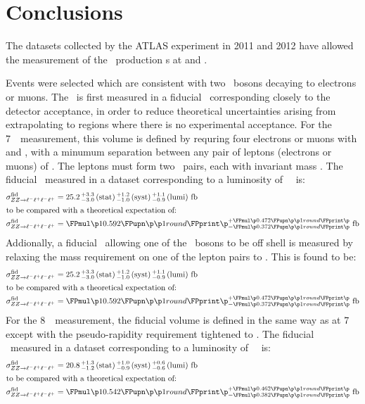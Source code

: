 \graphicspath{{Chapters/Conclusions/Figures/}}
\chapter{Conclusions}
\label{chap:Conclusions}
The datasets collected by the ATLAS experiment in 2011 and 2012 have allowed the
measurement of the \ZZ\ production \cx s at  and .

Events were selected which are consistent with two \Z\ bosons decaying to electrons or muons. The \cx\ is
first measured in a fiducial \phasespace\ corresponding closely to the detector
acceptance, in order to reduce theoretical uncertainties arising from
extrapolating to regions where there is no experimental acceptance.
For the 7~\tev\ measurement, this volume is defined by requring four
electrons or muons with  and , with a minumum separation
between any pair of leptons (electrons or muons) of . The leptons
must form two \ossf\ pairs, each with invariant mass \sstooos. 
The fiducial \cx\
measured in a dataset corresponding to a luminosity of
\LumiPassGRLTwentyEleven~\ifb\ is:
\begin{align}
\sigmaFidZZllll &= \ZZSevenTeVFiducialCrossSectionZZLLLL \\
\intertext{to be compared with a theoretical expectation of:}
\sigmaFidZZllll &= \ZZSevenTeVTheoryFiducialCrossSectionZZLLLL
\end{align}
Addionally, a fiducial \cx\ allowing one of the \Z\ bosons to be off shell is
measured by relaxing the mass requirement on one of the lepton pairs
to \mllgtt. This is found to be:
\begin{align}
\sigmaFidZZllll &= \ZZSevenTeVFiducialCrossSectionZZLLLL \\
\intertext{to be compared with a theoretical expectation of:}
\sigmaFidZZllll &= \ZZSevenTeVTheoryFiducialCrossSectionZZLLLL
\end{align}
For the 8~\tev\ measurement, the fiducial volume is defined in the same way as
at 7~\tev\, except with the pseudo-rapidity requirement tightened to . The fiducial \cx\
measured in a dataset corresponding to a luminosity of
\LumiPassGRLTwentyTwelve~\ifb\ is:
\begin{align}
\sigmaFidZZllll &= \ZZEightTeVFiducialCrossSectionZZLLLL \\
\intertext{to be compared with a theoretical expectation of:}
\sigmaFidZZllll &= \ZZEightTeVTheoryFiducialCrossSectionZZLLLL
\end{align}

